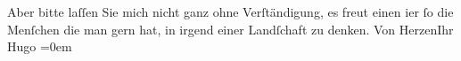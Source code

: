 \begin{ledgroupsized}[t]{13cm}
           \pstart
           {\pb}Aber bitte laſſen Sie mich nicht
               ganz ohne Verſtändigung, es freut einen i{\geminationm}er ſo die
               Menſchen die man gern hat, in irgend einer Landſchaft zu denken.\pend
           \pstart
           Von Herzen\hspace*{2em}Ihr{\\[\baselineskip]}\spacefill\mbox{Hugo}\pend
           \leftskip=0em{}\endnumbering{}\end{ledgroupsized}  \newcommand{\dateiname}{L00800}\newcommand{\titel}{Hugo von Hofmannsthal an Arthur Schnitzler, [3.? 6. 1898]}\newcommand{\editorInnen}{Martin Anton Müller und Gerd-Hermann Susen}
            \footnotesize
\begin{ledgroupsized}[t]{11.5cm}
\end{ledgroupsized}
         
      